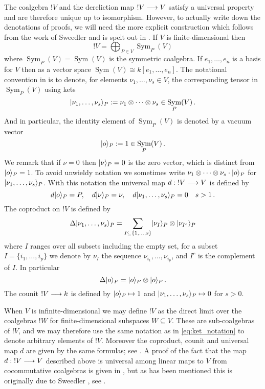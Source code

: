 \documentclass[english,letter paper,12pt,reqno]{article}
\DeclarePairedDelimiter\ket{\lvert}{\rangle}
\theoremstyle{example}
\numberwithin{equation}{section}
\DeclareMathOperator{\Sym}{Sym}
\begin{document}
The coalgebra ${!} V$ and the dereliction map ${!} V \longrightarrow V$ satisfy a universal property and are therefore unique up to isomorphism. However, to actually write down the denotations of proofs, we will need the more explicit construction which follows from the work of Sweedler \cite{sweedler} and is spelt out in \cite{murfet_coalg}. If $V$ is finite-dimensional then
\begin{equation}\label{eq:presentation_intro}
{!} V = \bigoplus_{P \in V} \Sym_P(V)
\end{equation}
where $\Sym_P(V) = \Sym(V)$ is the symmetric coalgebra. If $e_1,\ldots,e_n$ is a basis for $V$ then as a vector space $\Sym(V) \cong k[e_1,\ldots,e_n]$. The notational convention in \cite{murfet_coalg} is to denote, for elements $\nu_1,\ldots,\nu_s \in V$, the corresponding tensor in $\Sym_P(V)$ using kets
\begin{equation}\label{eq:ket_notation}
\ket{\nu_1,\ldots,\nu_s}_P := \nu_1 \otimes \cdots \otimes \nu_s \in \Sym_P(V)\,.
\end{equation}
And in particular, the identity element of $\Sym_P(V)$ is denoted by a vacuum vector
\begin{equation}\label{eq:vacuum}
\ket{o}_P := 1 \in \Sym_P(V)\,.
\end{equation}
We remark that if $\nu = 0$ then $\ket{\nu}_P = 0$ is the zero vector, which is distinct from $\ket{o}_P = 1$. To avoid unwieldy notation we sometimes write $\nu_1 \otimes \cdots \otimes \nu_s \cdot \ket{o}_P$ for $\ket{\nu_1,\ldots,\nu_s}_P$. With this notation the universal map $d: {!} V \longrightarrow V$ is defined by
\[
d \ket{o}_P = P, \quad d\ket{\nu}_P = \nu, \quad d\ket{\nu_1,\ldots,\nu_s}_P = 0 \quad s > 1\,.
\]
The coproduct on ${!} V$ is defined by
\begin{equation}\label{eq:lc_coalgebra_1}
\Delta \ket{ \nu_1, \ldots, \nu_s }_P = \sum_{I \subseteq \{ 1, \ldots, s \}} \ket{ \nu_I }_P \otimes \ket{ \nu_{I^c} }_P
\end{equation}
where $I$ ranges over all subsets including the empty set, for a subset $I = \{ i_1, \ldots, i_p \}$ we denote by $\nu_I$ the sequence $\nu_{i_1},\ldots,\nu_{i_p}$, and $I^c$ is the complement of $I$. In particular
\[
\Delta \ket{o}_P = \ket{o}_P \otimes \ket{o}_P\,.
\]
The counit ${!} V \longrightarrow k$ is defined by $\ket{o}_P \mapsto 1$ and $\ket{\nu_1,\ldots,\nu_s}_P \mapsto 0$ for $s > 0$.

When $V$ is infinite-dimensional we may define ${!} V$ as the direct limit over the coalgebras ${!} W$ for finite-dimensional subspaces $W \subseteq V$. These are sub-coalgebras of ${!} V$, and we may therefore use the same notation as in \eqref{eq:ket_notation} to denote arbitrary elements of ${!} V$. Moreover the coproduct, counit and universal map $d$ are given by the same formulas; see \cite[\S 2.1]{murfet_coalg}. A proof of the fact that the map $d: {!} V \longrightarrow V$ described above is universal among linear maps to $V$ from cocommutative coalgebras is given in \cite[Theorem 2.18]{murfet_coalg}, but as has been mentioned this is originally due to Sweedler \cite{sweedler}, see \cite[Appendix B]{murfet_coalg}.
\end{document}
